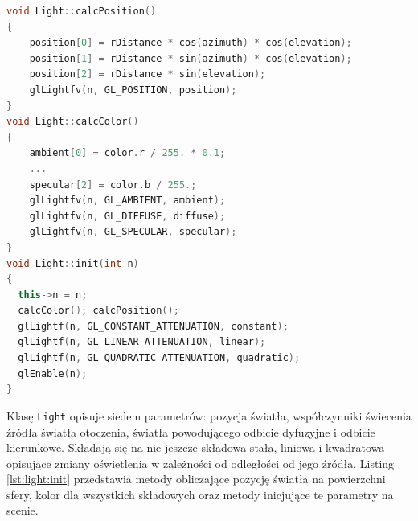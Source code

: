 \begin{lstlisting}[language=C++, caption=Metody inicjujące światło na scenie., label={lst:light:init}]
void Light::calcPosition()
{
    position[0] = rDistance * cos(azimuth) * cos(elevation);
    position[1] = rDistance * sin(azimuth) * cos(elevation);
    position[2] = rDistance * sin(elevation);
    glLightfv(n, GL_POSITION, position);
}
void Light::calcColor()
{
    ambient[0] = color.r / 255. * 0.1;
    ...
    specular[2] = color.b / 255.;
    glLightfv(n, GL_AMBIENT, ambient);
    glLightfv(n, GL_DIFFUSE, diffuse);
    glLightfv(n, GL_SPECULAR, specular);
}
void Light::init(int n)
{
  this->n = n;
  calcColor(); calcPosition();
  glLightf(n, GL_CONSTANT_ATTENUATION, constant);
  glLightf(n, GL_LINEAR_ATTENUATION, linear);
  glLightf(n, GL_QUADRATIC_ATTENUATION, quadratic);
  glEnable(n);
}
\end{lstlisting}


Klasę \lstinline{Light} opisuje siedem parametrów: pozycja światła, współczynniki świecenia źródła światła otoczenia, światła powodującego odbicie dyfuzyjne i odbicie kierunkowe. Składają się na nie jeszcze składowa stała, liniowa i kwadratowa opisujące zmiany oświetlenia w zależności od odległości od jego źródła. Listing \ref{lst:light:init} przedstawia metody obliczające pozycję światła na powierzchni sfery, kolor dla wszystkich składowych oraz metody inicjujące te parametry na scenie.


